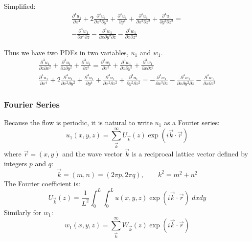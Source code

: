 \documentclass[12pt, a4paper, twoside, openright]{book}
\begin{document}
Simplified:
\begin{multline}
\frac{\partial^4 u_1}{\partial x^4} 
+ 2 \frac{\partial^4 u_1}{\partial x^2 \partial y^2} 
+ \frac{\partial^4 u_1}{\partial y^4}
+ \frac{\partial^4 u_1}{\partial x^2 \partial z^2} 
+ \frac{\partial^4 u_1}{\partial y^2 \partial z^2}
=  \\
- \frac{\partial^4 w_1}{\partial x^3 \partial z} 
- \frac{\partial^4 w_1}{\partial x \partial y^2 \partial z} 
- \frac{\partial^4 w_1}{\partial x \partial z^3} 
\end{multline}

Thus we have two PDEs in two variables, $u_1$ and $w_1$.
\begin{gather}
\frac{\partial^3 u_1}{\partial z \partial x^2} + \frac{\partial^3 u_1}{\partial z \partial y^2}
+ \frac{\partial^3 u_1}{\partial z^3} =
\frac{\partial^3 w_1}{\partial x^3} + \frac{\partial^3 w_1}{\partial x \partial y^2}
+ \frac{\partial^3 w_1}{\partial x \partial z^2} 
\\
\frac{\partial^4 u_1}{\partial x^4} 
+ 2 \frac{\partial^4 u_1}{\partial x^2 \partial y^2} 
+ \frac{\partial^4 u_1}{\partial y^4}
+ \frac{\partial^4 u_1}{\partial x^2 \partial z^2} 
+ \frac{\partial^4 u_1}{\partial y^2 \partial z^2}
=
- \frac{\partial^4 w_1}{\partial x^3 \partial z} 
- \frac{\partial^4 w_1}{\partial x \partial y^2 \partial z} 
- \frac{\partial^4 w_1}{\partial x \partial z^3} 
\end{gather}


\subsubsection*{Fourier Series}

Because the flow is periodic, it is natural to write $u_1$ as a Fourier series:
\begin{equation}
u_1(x,y,z) = \sum_{\vec{k}}^{\infty} U_{\vec{k}}(z) \exp(i \vec{k}\cdot \vec{r})
\end{equation}
where $\vec{r} = (x,y)$ and the wave vector $\vec{k}$ is a reciprocal lattice vector defined by integers $p$ and $q$:
\begin{equation}
\vec{k} = (m,n) = (2\pi p, 2\pi q), \qquad k^2 = m^2 + n^2
\end{equation}
The Fourier coefficient is:
\begin{equation}
U_{\vec{k}}(z) = \frac{1}{L^2} \int_0^L \int_0^L u(x,y,z) \exp(i \vec{k} \cdot \vec{r})
\;dxdy
\end{equation}
Similarly for $w_1$:
\begin{equation}
w_1(x,y,z) = \sum_{\vec{k}}^{\infty} W_{\vec{k}}(z) \exp(i \vec{k}\cdot \vec{r})
\end{equation}
\end{document}
